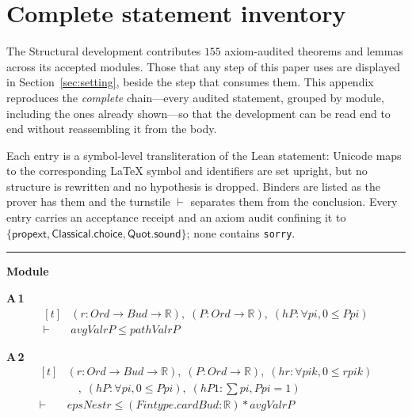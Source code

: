 \appendices
\section{Complete statement inventory}
\label{app:inventory}

The Structural development contributes $155$ axiom-audited theorems and lemmas across its accepted modules. Those that any step of this paper uses are displayed in Section~\ref{sec:setting}, beside the step that consumes them. This appendix reproduces the \emph{complete} chain---every audited statement, grouped by module, including the ones already shown---so that the development can be read end to end without reassembling it from the body.

Each entry is a symbol-level transliteration of the Lean statement: Unicode maps to the corresponding \LaTeX{} symbol and identifiers are set upright, but no structure is rewritten and no hypothesis is dropped. Binders are listed as the prover has them and the turnstile $\vdash$ separates them from the conclusion. Every entry carries an acceptance receipt and an axiom audit confining it to $\{\textsf{propext},\textsf{Classical.choice},\textsf{Quot.sound}\}$; none contains \texttt{sorry}.

\vspace{4pt}\noindent\rule{\columnwidth}{0.4pt}\par\vspace{2pt}
\noindent\textbf{Module }\par\vspace{3pt}

\noindent\textbf{A\,1}\quad{}
{\footnotesize\[ \begin{aligned}[t]
&(\mathit{r} : \mathit{Ord} \to \mathit{Bud} \to \mathbb{R} ),\; (\mathit{P} : \mathit{Ord} \to \mathbb{R} ),\; (\mathit{hP} : \forall \mathit{pi}, 0 \leq \mathit{P} \mathit{pi})\\
\vdash\;&\mathit{avgVal} \mathit{r} \mathit{P} \leq \mathit{pathVal} \mathit{r} \mathit{P}
\end{aligned} \]}

\noindent\textbf{A\,2}\quad{}
{\footnotesize\[ \begin{aligned}[t]
&(\mathit{r} : \mathit{Ord} \to \mathit{Bud} \to \mathbb{R} ),\; (\mathit{P} : \mathit{Ord} \to \mathbb{R} ),\; (\mathit{hr} : \forall \mathit{pi} \mathit{k}, 0 \leq \mathit{r} \mathit{pi} \mathit{k})\\
&\quad ,\; (\mathit{hP} : \forall \mathit{pi}, 0 \leq \mathit{P} \mathit{pi}),\; (\mathit{hP1} : \textstyle\sum \mathit{pi}, \mathit{P} \mathit{pi} = 1)\\
\vdash\;&\mathit{epsNest} \mathit{r} \leq (\mathit{Fintype}.\mathit{card} \mathit{Bud} : \mathbb{R} ) * \mathit{avgVal} \mathit{r} \mathit{P}
\end{aligned} \]}

